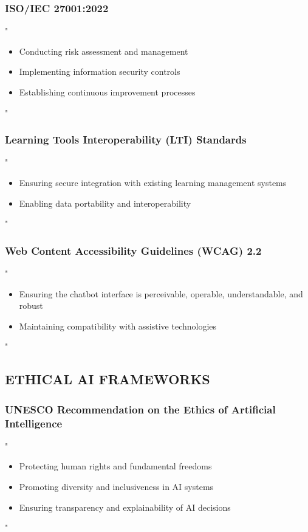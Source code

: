 \documentclass[14pt,a4paper]{article}
\begin{document}
\subsubsection*{ISO/IEC 27001:2022}
"
\begin{itemize}
    \item Conducting risk assessment and management
    \item Implementing information security controls
    \item Establishing continuous improvement processes
\end{itemize}
"

\textit{\parencite{ISO2022}}


\subsubsection*{Learning Tools Interoperability (LTI) Standards}
"
\begin{itemize}
    \item Ensuring secure integration with existing learning management systems
    \item Enabling data portability and interoperability
\end{itemize}
"

\textit{\parencite{IMSGlobal2024}}


\subsubsection*{Web Content Accessibility Guidelines (WCAG) 2.2}
"
\begin{itemize}
    \item Ensuring the chatbot interface is perceivable, operable, understandable, and robust
    \item Maintaining compatibility with assistive technologies
\end{itemize}
"

\textit{\parencite{W3C2024}}

\subsection*{ETHICAL AI FRAMEWORKS}

\subsubsection*{UNESCO Recommendation on the Ethics of Artificial Intelligence}
"
\begin{itemize}
    \item Protecting human rights and fundamental freedoms
    \item Promoting diversity and inclusiveness in AI systems
    \item Ensuring transparency and explainability of AI decisions
\end{itemize}
"
\end{document}
